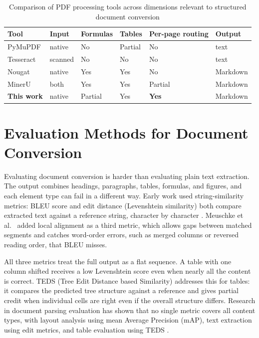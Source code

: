 \begin{table}[ht]
\centering
\caption{Comparison of PDF processing tools across dimensions relevant to
structured document conversion}
\label{tab:tool_comparison}
\small\setlength{\tabcolsep}{4pt}
\renewcommand{\arraystretch}{1.3}
\begin{tabularx}{\textwidth}{lXXXXX}
\toprule
\textbf{Tool} & \textbf{Input} & \textbf{Formulas} & \textbf{Tables} & \textbf{Per-page routing} & \textbf{Output} \\
\midrule
PyMuPDF    & native  & No      & Partial & No              & text     \\
Tesseract  & scanned & No      & No      & No              & text     \\
Nougat     & native  & Yes     & Yes     & No              & Markdown \\
MinerU     & both    & Yes     & Yes     & Partial         & Markdown \\
\textbf{This work} & native & Partial & Yes & \textbf{Yes} & Markdown \\
\bottomrule
\end{tabularx}
\end{table}

\section{Evaluation Methods for Document Conversion}

Evaluating document conversion is harder than evaluating plain text extraction.
The output combines headings, paragraphs, tables, formulas, and figures, and each
element type can fail in a different way. Early work used string-similarity
metrics: BLEU score and edit distance (Levenshtein similarity) both compare
extracted text against a reference string, character by character
\autocite{papineni2002}. Meuschke et al.\ \autocite{meuschke2023} added local
alignment as a third metric, which allows gaps between matched segments and
catches word-order errors, such as merged columns or reversed reading order, that
BLEU misses.

All three metrics treat the full output as a flat sequence. A table with one
column shifted receives a low Levenshtein score even when nearly all the content
is correct. TEDS (Tree Edit Distance based Similarity) addresses this for tables:
it compares the predicted tree structure against a reference and gives partial
credit when individual cells are right even if the overall structure differs.
Research in document parsing evaluation has shown that no single metric covers
all content types, with layout analysis using mean Average Precision (mAP), text
extraction using edit metrics, and table evaluation using TEDS
\autocite{zhong2020, pfitzmann2022}.

